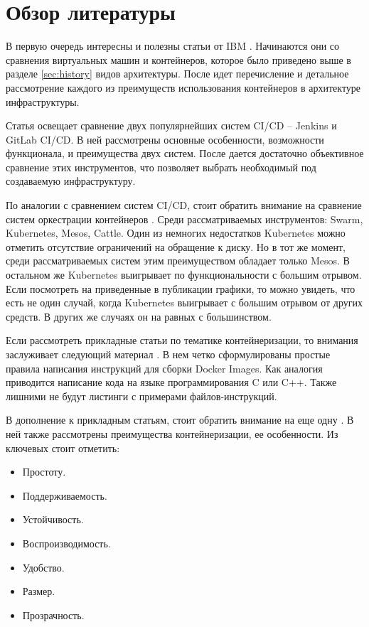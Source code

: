 \section{Обзор литературы}
\label{sec:lit-rev}

В первую очередь интересны и полезны статьи от IBM \cite{ibm:containers1}\cite{ibm:containers2}. Начинаются они со сравнения виртуальных машин и контейнеров, которое было приведено выше в разделе \ref{sec:history} видов архитектуры. После идет перечисление и детальное рассмотрение каждого из преимуществ использования контейнеров в архитектуре инфраструктуры.

Статья \cite{habr:ruvds:jenkins-vs-gitlab} освещает сравнение двух популярнейших систем CI/CD -- Jenkins и GitLab CI/CD. В ней рассмотрены основные особенности, возможности функционала, и преимущества двух систем. После дается достаточно объективное сравнение этих инструментов, что позволяет выбрать необходимый под создаваемую инфраструктуру.

По аналогии с сравнением систем CI/CD, стоит обратить внимание на сравнение систем оркестрации контейнеров \cite{al2019container}. Среди рассматриваемых инструментов: Swarm, Kubernetes, Mesos, Cattle. Один из немногих недостатков Kubernetes можно отметить отсутствие ограничений на обращение к диску. Но в тот же момент, среди рассматриваемых систем этим преимуществом обладает только Mesos. В остальном же Kubernetes выигрывает по функциональности с большим отрывом. Если посмотреть на приведенные в публикации графики, то можно увидеть, что есть не один случай, когда Kubernetes выигрывает с большим отрывом от других средств. В других же случаях он на равных с большинством.

Если рассмотреть прикладные статьи по тематике контейнеризации, то внимания заслуживает следующий материал \cite{nust2020ten}. В нем четко сформулированы простые правила написания инструкций для сборки Docker Images. Как аналогия приводится написание кода на языке программирования C или C++. Также лишними не будут листинги с примерами файлов-инструкций.

В дополнение к прикладным статьям, стоит обратить внимание на еще одну \cite{gruening2018recommendations}. В ней также рассмотрены преимущества контейнеризации, ее особенности. Из ключевых стоит отметить:
\begin{itemize}
    \item Простоту.
    \item Поддерживаемость.
    \item Устойчивость.
    \item Воспроизводимость.
    \item Удобство.
    \item Размер.
    \item Прозрачность.
\end{itemize}

